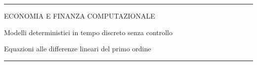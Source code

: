 \documentclass[12pt,aspectratio=169]{beamer}
\begin{document}
\begin{frame}
\unitlength 5mm

\begin{center}

\rule{\textwidth}{2pt}

\vskip3mm
ECONOMIA E FINANZA COMPUTAZIONALE

Modelli deterministici in tempo discreto senza controllo

Equazioni alle differenze lineari del primo ordine
\rule{\textwidth}{2pt}

\end{center}

\end{frame}


\end{document}
